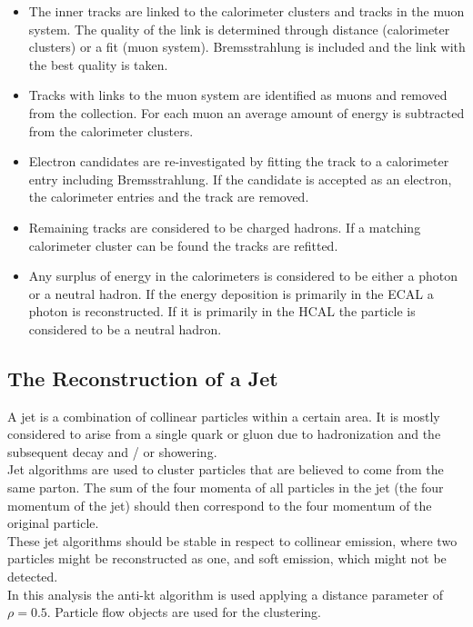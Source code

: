 \begin{itemize}
\item The inner tracks are linked to the calorimeter clusters and tracks in the muon system. The quality of the link is determined through distance (calorimeter clusters) or a fit (muon system). Bremsstrahlung is included and the link with the best quality is taken.
\item Tracks with links to the muon system are identified as muons and removed from the collection. For each muon an average amount of energy is subtracted from the calorimeter clusters.
\item Electron candidates are re-investigated by fitting the track to a calorimeter entry including Bremsstrahlung. If the candidate is accepted as an electron, the calorimeter entries and the track are removed.
\item Remaining tracks are considered to be charged hadrons. If a matching calorimeter cluster can be found the tracks are refitted.
\item Any surplus of energy in the calorimeters is considered to be either a photon or a neutral hadron. If the energy deposition is primarily in the ECAL a photon is reconstructed. If it is primarily in the HCAL the particle is considered to be a neutral hadron.
\end{itemize}

\subsection{The Reconstruction of a Jet}

A jet is a combination of collinear particles within a certain area. It is mostly considered to arise from a single quark or gluon due to hadronization and the subsequent decay and / or showering. \\
Jet algorithms are used to cluster particles that are believed to come from the same parton. The sum of the four momenta of all particles in the jet (the four momentum of the jet) should then correspond to the four momentum of the original particle. \\
These jet algorithms should be stable in respect to collinear emission, where two particles might be reconstructed as one, and soft emission, which might not be detected. \\
In this analysis the anti-kt algorithm is used \cite{Cacciari:2008gp} applying a distance parameter of $\rho = 0.5$. Particle flow objects are used for the clustering. \\

